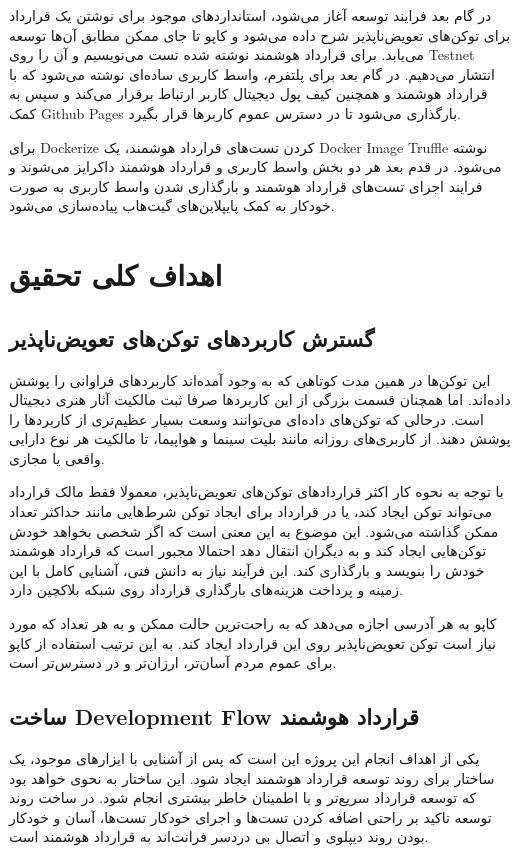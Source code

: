 در گام بعد فرایند توسعه آغاز می‌شود،
استاندارد‌های موجود برای نوشتن یک قرارداد برای توکن‌های تعویض‌ناپذیر شرح داده می‌شود و
کاپو تا جای ممکن مطابق آن‌ها توسعه می‌یابد.
برای قرارداد هوشمند نوشته شده تست می‌نویسیم و آن را روی
\gls{Testnet}
انتشار می‌دهیم.
در گام بعد برای پلتفرم،
واسط کاربری ساده‌ای نوشته می‌شود که با قرارداد هوشمند و
همچنین کیف پول دیجیتال کاربر ارتباط برقرار می‌کند و سپس به کمک
\gls{Github Pages}
بارگذاری می‌شود تا در دسترس عموم کاربرها قرار بگیرد.

برای
\gls{Dockerize}
کردن تست‌های قرارداد هوشمند، یک
\gls{Docker Image}
\gls{Truffle}
نوشته می‌شود.
در قدم بعد هر دو بخش واسط کاربری و قرارداد هوشمند داکرایز می‌شوند
و فرایند اجرای تست‌های قرارداد هوشمند
و بارگذاری شدن واسط کاربری به صورت خودکار به کمک پایپلاین‌های گیت‌هاب پیاده‌سازی می‌شود.


\section{اهداف کلی تحقیق}
\subsection{گسترش کاربرد‌های توکن‌های تعویض‌ناپذیر}
این توکن‌ها در همین مدت کوتاهی که به وجود آمده‌اند کاربردهای فراوانی را پوشش داده‌اند.
اما همچنان قسمت بزرگی از این کاربردها صرفا ثبت مالکیت آثار هنری دیجیتال است.
درحالی که توکن‌های داده‌ای می‌توانند وسعت بسیار عظیم‌تری از کاربردها را پوشش دهند.
از کاربری‌های روزانه مانند بلیت سینما و هواپیما، تا مالکیت هر نوع دارایی واقعی یا مجازی.

با توجه به نحوه کار اکثر قراردادهای توکن‌های تعویض‌ناپذیر،
معمولا فقط مالک قرارداد می‌تواند توکن ایجاد کند،
یا در قرارداد برای ایجاد توکن شرط‌هایی مانند حداکثر تعداد ممکن گذاشته می‌شود.
این موضوع به این معنی است که اگر شخصی بخواهد خودش توکن‌هایی ایجاد کند
و به دیگران انتقال دهد احتمالا مجبور است که قرارداد هوشمند خودش را بنویسد و بارگذاری کند.
این فرآیند نیاز به دانش فنی، آشنایی کامل با این زمینه و پرداخت هزینه‌های بارگذاری قرارداد روی شبکه بلاکچین دارد.

کاپو به هر آدرسی اجازه می‌دهد که به راحت‌ترین حالت ممکن
و به هر تعداد که مورد نیاز است توکن تعویض‌ناپذیر روی این قرارداد ایجاد کند.
به این ترتیب استفاده از کاپو برای عموم مردم آسان‌تر، ارزان‌تر و در دسترس‌تر است.


\subsection{ساخت
\gls{Development Flow}
قرارداد هوشمند}
یکی از اهداف انجام این پروژه این است که پس از آشنایی با ایزارهای موجود،
یک ساختار برای روند توسعه قرارداد هوشمند ایجاد شود.
این ساختار به نحوی خواهد بود که توسعه قرارداد سریع‌تر و با اطمینان خاطر بیشتری انجام شود.
در ساخت روند توسعه تاکید بر راحتی اضافه کردن تست‌ها و اجرای خودکار تست‌ها،
آسان و خودکار بودن روند دیپلوی و اتصال بی دردسر فرانت‌اند به قرارداد هوشمند است.

